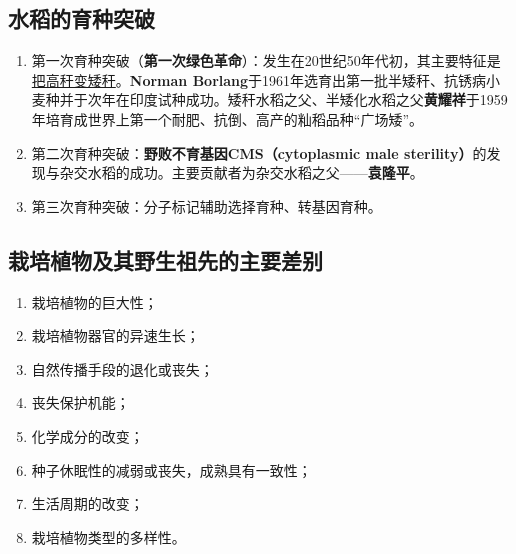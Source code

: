 \subsection{水稻的育种突破}
\begin{enumerate}
    \item 第一次育种突破（\textbf{第一次绿色革命}）：发生在20世纪50年代初，其主要特征是\uline{把高秆变矮秆}。\textbf{Norman Borlang}于1961年选育出第一批半矮秆、抗锈病小麦种并于次年在印度试种成功。矮秆水稻之父、半矮化水稻之父\textbf{黄耀祥}于1959年培育成世界上第一个耐肥、抗倒、高产的籼稻品种“广场矮”。
    \item 第二次育种突破：\textbf{野败不育基因CMS（cytoplasmic male sterility）}的发现与杂交水稻的成功。主要贡献者为杂交水稻之父——\textbf{袁隆平}。
    \item 第三次育种突破：分子标记辅助选择育种、转基因育种。
\end{enumerate}

\subsection{栽培植物及其野生祖先的主要差别}
\begin{enumerate}
    \item 栽培植物的巨大性；
    \item 栽培植物器官的异速生长；
    \item 自然传播手段的退化或丧失；
    \item 丧失保护机能；
    \item 化学成分的改变；
    \item 种子休眠性的减弱或丧失，成熟具有一致性；
    \item 生活周期的改变；
    \item 栽培植物类型的多样性。
\end{enumerate}